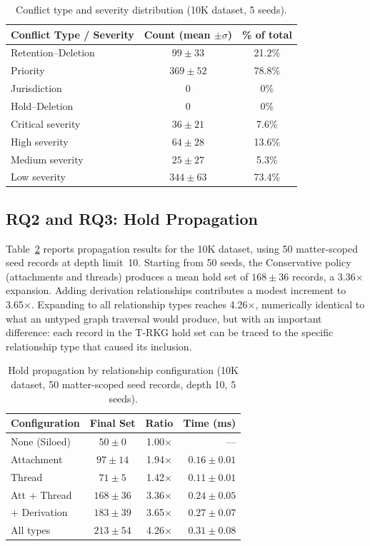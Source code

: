 \documentclass{ieeeaccess}
\begin{document}
\begin{table}[t]
\centering
\caption{Conflict type and severity distribution (10K dataset, 5 seeds).}
\label{tab:typesev}
\begin{tabular}{lcc}
\hline\hline
Conflict Type / Severity & Count (mean $\pm \sigma$) & \% of total \\
\hline
Retention--Deletion & $99 \pm 33$  & 21.2\% \\
Priority            & $369 \pm 52$ & 78.8\% \\
Jurisdiction        & 0            & 0\% \\
Hold--Deletion      & 0            & 0\% \\
\hline
Critical severity   & $36 \pm 21$  & 7.6\% \\
High severity       & $64 \pm 28$  & 13.6\% \\
Medium severity     & $25 \pm 27$  & 5.3\% \\
Low severity        & $344 \pm 63$ & 73.4\% \\
\hline\hline
\end{tabular}
\end{table}

\subsection{RQ2 and RQ3: Hold Propagation}

Table~\ref{tab:propagation} reports propagation results for the 10K dataset, using 50 matter-scoped seed records at depth limit~10. Starting from 50 seeds, the Conservative policy (attachments and threads) produces a mean hold set of $168 \pm 36$ records, a 3.36$\times$ expansion. Adding derivation relationships contributes a modest increment to 3.65$\times$. Expanding to all relationship types reaches 4.26$\times$, numerically identical to what an untyped graph traversal would produce, but with an important difference: each record in the T-RKG hold set can be traced to the specific relationship type that caused its inclusion.

\begin{table}[t]
\centering
\caption{Hold propagation by relationship configuration (10K dataset, 50 matter-scoped seed records, depth 10, 5 seeds).}
\label{tab:propagation}
\begin{tabular}{lccr}
\hline\hline
Configuration & Final Set & Ratio & Time (ms) \\
\hline
None (Siloed)   & $50 \pm 0$    & 1.00$\times$ & --- \\
Attachment      & $97 \pm 14$   & 1.94$\times$ & $0.16 \pm 0.01$ \\
Thread          & $71 \pm 5$    & 1.42$\times$ & $0.11 \pm 0.01$ \\
Att + Thread    & $168 \pm 36$  & 3.36$\times$ & $0.24 \pm 0.05$ \\
+ Derivation    & $183 \pm 39$  & 3.65$\times$ & $0.27 \pm 0.07$ \\
All types       & $213 \pm 54$  & 4.26$\times$ & $0.31 \pm 0.08$ \\
\hline\hline
\end{tabular}
\end{table}
\end{document}
